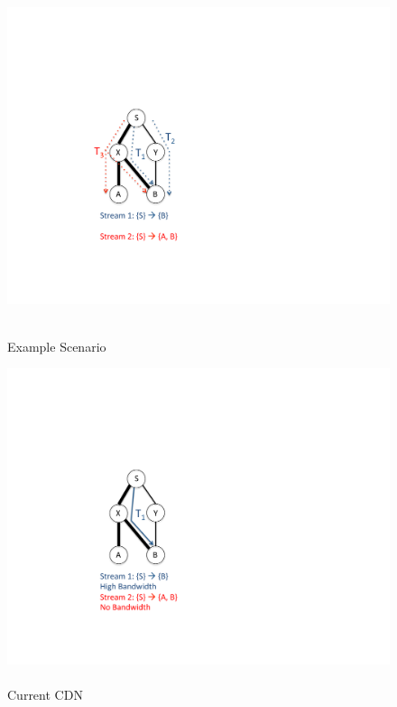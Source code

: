 \captionsetup{font=small}

\begin{figure}[t]
\centering
\begin{minipage}[b]{0.32\columnwidth}
  \centering
  \includegraphics[scale=.40]{figures/toy-alltrees}
  \caption{\\Example Scenario}
  \label{fig:toy-alltrees}
\end{minipage}
\begin{minipage}[b]{0.32\columnwidth}
  \centering
  \includegraphics[scale=.40]{figures/toy-current}
  \caption{\\Current CDN}
  \label{fig:toy-current}
\end{minipage}

\end{figure}
